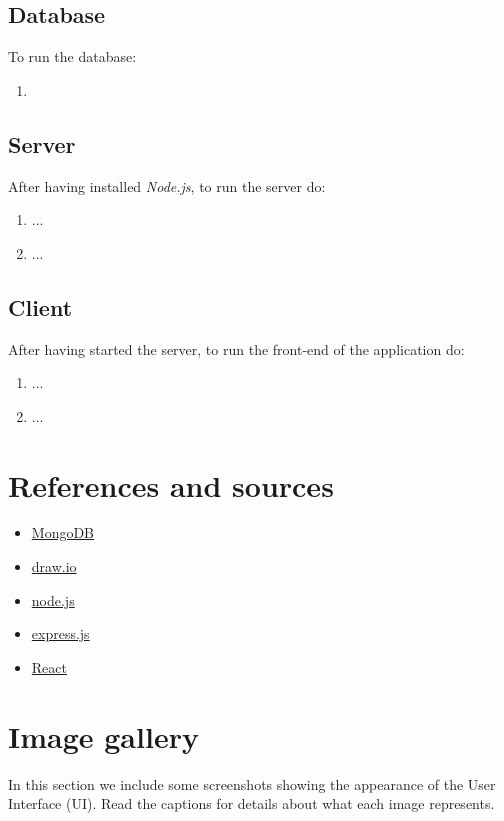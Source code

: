 \documentclass{article}
\begin{document}
\subsection{Database}
To run the database:
\begin{enumerate}
    \item 
\end{enumerate}
\subsection{Server}
After having installed \textit{Node.js}, to run the server do:
\begin{enumerate}
    \item ...
    \item ...
\end{enumerate}
\subsection{Client}
After having started the server, to run the front-end of the application do:
\begin{enumerate}
    \item ...
    \item ...
\end{enumerate}
\section{References and sources}
\begin{itemize}
    \item \href{https://www.mongodb.com}{MongoDB}
    \item \href{https://app.diagrams.net}{draw.io}
    \item \href{https://nodejs.org}{node.js}
    \item \href{https://expressjs.com}{express.js}
    \item \href{https://reactjs.org/}{React}
\end{itemize}
\section{Image gallery}
In this section we include some screenshots showing the appearance of the User Interface (UI). Read the captions for details about what each image represents.
    
\end{document}
